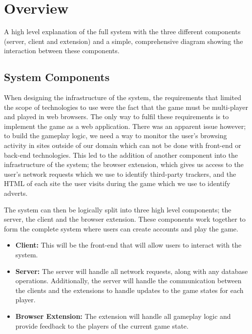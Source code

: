\documentclass{l4proj}
\begin{document}
\section{Overview}
A high level explanation of the full system with the three different components (server, client and extension) and a simple, comprehensive diagram showing the interaction between these components.
\subsection{System Components}
When designing the infrastructure of the system, the requirements that limited the scope of technologies to use were the fact that the game must be multi-player and played in web browsers. The only way to fulfil these requirements is to implement the game as a web application. There was an apparent issue however; to build the gameplay logic, we need a way to monitor the user's browsing activity in sites outside of our domain which can not be done with front-end or back-end technologies. This led to the addition of another component into the infrastructure of the system; the browser extension, which gives us access to the user's network requests which we use to identify third-party trackers, and the HTML of each site the user visits during the game which we use to identify adverts.

The system can then be logically split into three high level components; the server, the client and the browser extension. These components work together to form the complete system where users can create accounts and play the game.
\begin{itemize}
    \item
    \textbf{Client:} This will be the front-end that will allow users to interact with the system.
    \item
    \textbf{Server:} The server will handle all network requests, along with any database operations. Additionally, the server will handle the communication between the clients and the extensions to handle updates to the game states for each player.
    \item
    \textbf{Browser Extension:} The extension will handle all gameplay logic and provide feedback to the players of the current game state.
\end{itemize}
\end{document}
